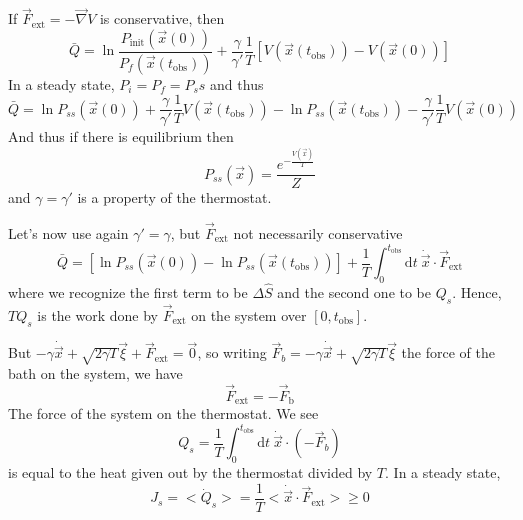 \documentclass[a4paper]{book}
\theoremstyle{definition}
\theoremstyle{remark}
\begin{document}
If $\vec{F}_{\text{ext}} = -\vec{\nabla}V$ is conservative, then 
\begin{equation}
    \bar{Q} = \ln\frac{P_{\text{init}}(\vec{x}(0))}{P_{f}(\vec{x}(t_\text{obs}))} + \frac{\gamma}{\gamma '}\frac{1}{T}\left[V(\vec{x}(t_\text{obs})) - V(\vec{x}(0))\right]
\end{equation}
In a steady state, $P_i = P_f = P_ss$ and thus 
\begin{equation}
    \bar{Q} = \ln P_{ss}(\vec{x}(0))  + \frac{\gamma}{\gamma '}\frac{1}{T}V(\vec{x}(t_\text{obs})) - \ln P_{ss}(\vec{x}(t_\text{obs})) - \frac{\gamma}{\gamma '}\frac{1}{T}V(\vec{x}(0))
\end{equation}
And thus if there is equilibrium then 
\begin{equation}
    P_{ss}(\vec{x}) = \frac{e^{-\frac{V(\vec{x})}{T}}}{Z}
\end{equation}
and $\gamma = \gamma '$ is a property of the thermostat. \par \medskip 

Let's now use again $\gamma' = \gamma$, but $\vec{F}_{\text{ext}}$ not necessarily conservative 
\begin{equation}
    \bar{Q} = \left[\ln P_{ss}(\vec{x}(0)) - \ln P_{ss}(\vec{x}(t_{\text{obs}}))  \right] + \frac{1}{T} \int_{0}^{t_{\text{obs}}} \text{d}t ~\dot{\vec{x}}\cdot \vec{F}_{\text{ext}}
\end{equation}
where we recognize the first term to be $\Delta \hat{S}$ and the second one to be $Q_s$. Hence, $TQ_s$ is the work done by $\vec{F}_{\text{ext}}$ on the system over $[0, t_{\text{obs}}]$.\par 
But $-\gamma \dot{\vec{x}} + \sqrt{2\gamma T}\vec{\xi} + \vec{F}_{\text{ext}} = \vec{0}$, so writing $\vec{F}_b = -\gamma \dot{\vec{x}} + \sqrt{2\gamma T}\vec{\xi}$ the force of the bath on the system, we have 
\begin{equation}
    \vec{F}_{\text{ext}} = -\vec{F}_{\text{b}}
\end{equation}
The force of the system on the thermostat. We see
\begin{equation}
    Q_s = \frac{1}{T}\int_{0}^{t_{\text{obs}}} \text{d}t ~\dot{\vec{x}} \cdot (-\vec{F}_b)
\end{equation}
is equal to the heat given out by the thermostat divided by $T$. In a steady state, 
\begin{equation}
    J_s = <\dot{Q}_s> = \frac{1}{T}<\dot{\vec{x}}\cdot \vec{F}_{\text{ext}}> \geq 0
\end{equation}
\end{document}
